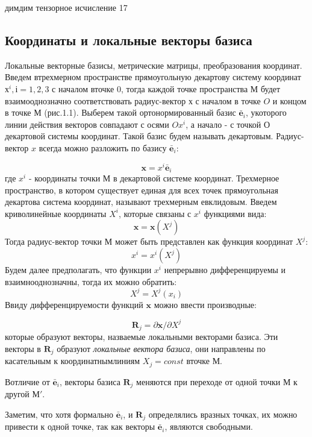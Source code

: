 димдим тензорное исчисление 17

\subsection{ Координаты и локальные векторы базиса}
  Локальные векторные базисы, метрические матрицы, преобразования координат.
Введем втрехмерном пространстве прямоугольную декартову систему координат$х^i, і= 1, 2, 3$ с началом вточке 0, тогда каждой точке пространства $М$ будет взаимооднозначно соответствовать радиус-вектор $х$ с началом в точке $O$ и концом в точке $М$ (рис.1.1). Выберем такой ортонормированный базис $\bar{\textbf{e}}_i$, укоторого линии действия векторов совпадают с осями $Ox^i$, а начало - с точкой $О$ декартовой системы координат. Такой базис будем называть декартовым. Радиус-вектор $x$ всегда можно разложить по базису $\bar{\textbf{e}}_i$:

\begin{equation}
    \textbf{x} = x^i\bar{\textbf{e}}_i
\end{equation}
где $x^i$ - координаты точки $М$ в декартовой системе координат. Трехмерное пространство, в котором существует единая для всех точек прямоугольная декартова система координат, называют трехмерным евклидовым.
Введем криволинейные координаты $X^i$, которые связаны с $x^i$ функциями вида:
\begin{equation}
    \textbf{x} = \textbf{x}(X^j)
\end{equation}
Тогда радиус-вектор точки $М$ может быть представлен как функция координат 
$X^j$:
\begin{equation}
    x^i = x^i(X^j)
\end{equation}
Будем далее предполагать, что функции $x^i$ непрерывно дифференцируемы и взаимнооднозначны, тогда их можно обратить:
\begin{equation}
    X^j = X^j(x_i)
\end{equation}
Ввиду дифференцируемости функций $\textbf{x}$ можно ввести производные:

\begin{equation}
    \textbf{R}_j = \partial\textbf{x}/\partial X^j
\end{equation}
которые образуют векторы, назваемые локальными векторами базиса. Эти векторы в $\textbf{R}_j$ образуют \textit{локальные вектора базиса}, они направлены по касательным к координатнымлиниям $X_j=const$ вточке $М$.\par
Вотличие от $\bar{\textbf{e}}_i$, векторы базиса $\textbf{R}_j$  меняются при переходе от одной точки $М$ к другой $М'$.\par
Заметим, что хотя формально $\bar{\textbf{e}}_i$, и $\textbf{R}_j$ определялись вразных точках, их можно привести к одной точке, так как векторы $\bar{\textbf{e}}_i$, являются свободными.\par


